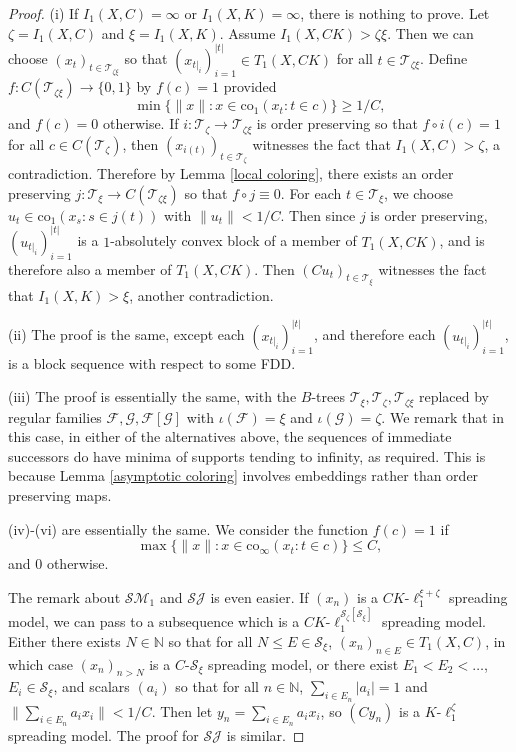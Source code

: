 \documentclass[12pt]{amsart}
\theoremstyle{definition}
\newcommand{\nn}{\mathbb{N}}
\newcommand{\fff}{\mathcal{F}}
\newcommand{\gggg}{\mathcal{G}}
\newcommand{\ttt}{\mathcal{T}}
\newcommand{\sss}{\mathcal{S}}
\newcommand{\ssm}{\mathcal{SM}}
\newcommand{\ssj}{\mathcal{SJ}}
\begin{document}
\begin{proof} (i) If $I_1(X, C)=\infty$ or $I_1(X, K)=\infty$, there is nothing to prove. Let $\zeta=I_1(X,C)$ and $\xi=I_1(X,K)$.  Assume $I_1(X, CK)>\zeta\xi$.  Then we can choose $(x_t)_{t\in \ttt_{\zeta\xi}}$ so that $(x_{t|_i})_{i=1}^{|t|}\in T_1(X, CK)$ for all $t\in \ttt_{\zeta\xi}$.  Define $f:C(\ttt_{\zeta\xi})\to \{0,1\}$ by $f(c)= 1$ provided $$\min \{\|x\|: x\in \text{co}_1(x_t:t\in c)\}\geqslant 1/C,$$ and $f(c)=0$ otherwise.  If $i:\ttt_\zeta\to \ttt_{\zeta\xi}$ is order preserving so that $f\circ i(c)=1$ for all $c\in C(\ttt_\zeta)$, then $(x_{i(t)})_{t\in \ttt_\zeta}$ witnesses the fact that $I_1(X, C)>\zeta$, a contradiction.  Therefore by Lemma \ref{local coloring}, there exists an order preserving $j:\ttt_\xi\to C(\ttt_{\zeta\xi})$ so that $f\circ j\equiv 0$.  For each $t\in \ttt_\xi$, we choose $u_t\in \text{co}_1(x_s: s\in j(t))$ with $\|u_t\|< 1/C$.  Then since $j$ is order preserving, $(u_{t|_i})_{i=1}^{|t|}$ is a $1$-absolutely convex block of a member of $T_1(X, CK)$, and is therefore also a member of $T_1(X, CK)$.  Then $(Cu_t)_{t\in \ttt_\xi}$ witnesses the fact that $I_1(X, K)>\xi$, another contradiction.  

(ii) The proof is the same, except each $(x_{t|_i})_{i=1}^{|t|}$, and therefore each $(u_{t|_i})_{i=1}^{|t|}$, is a block sequence with respect to some FDD.  

(iii) The proof is essentially the same, with the $B$-trees $\ttt_\xi, \ttt_\zeta, \ttt_{\zeta\xi}$ replaced by regular families $\fff, \gggg, \fff[\gggg]$ with $\iota(\fff)=\xi$ and $\iota(\gggg)=\zeta$.  We remark that in this case, in either of the alternatives above, the sequences of immediate successors do have minima of supports tending to infinity, as required.  This is because Lemma \ref{asymptotic coloring} involves embeddings rather than order preserving maps.  

(iv)-(vi) are essentially the same.  We consider the function $f(c)=1$ if $$\max \{\|x\|: x\in \text{co}_\infty(x_t:t\in c)\}\leqslant C,$$ and $0$ otherwise.  


The remark about $\ssm_1$ and $\ssj$ is even easier.  If $(x_n)$ is a $CK$-$\ell_1^{\xi+\zeta}$ spreading model, we can pass to a subsequence which is a $CK$-$\ell_1^{\sss_\zeta[\sss_\xi]}$ spreading model.  Either there exists $N\in \nn$ so that for all $N\leqslant E\in \sss_\xi$, $(x_n)_{n\in E}\in T_1(X, C)$, in which case $(x_n)_{n>N}$ is a $C$-$\sss_\xi$ spreading model, or there exist $E_1<E_2<\ldots$, $E_i\in \sss_\xi$, and scalars $(a_i)$ so that for all $n\in \nn$, $\sum_{i\in E_n}|a_i|=1$ and $\|\sum_{i\in E_n} a_ix_i\|<1/C$.  Then let $y_n=\sum_{i\in E_n}a_ix_i$, so $(Cy_n)$ is a $K$-$\ell_1^\zeta$ spreading model.  The proof for $\ssj$ is similar.  
 




\end{proof}
\end{document}
